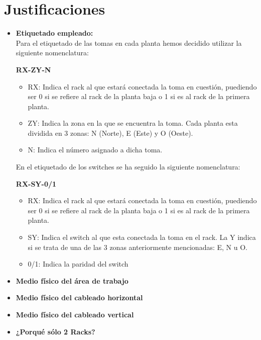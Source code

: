 \section{Justificaciones}
\begin{itemize}
    \item \textbf{Etiquetado empleado: }\\ Para el etiquetado de las tomas en cada planta hemos decidido utilizar la siguiente nomenclatura: \centerline{\textbf{RX-ZY-N}}
    \begin{itemize}
        \item RX: Indica el rack al que estará conectada la toma en cuestión, puediendo ser 0 si se refiere al rack de la planta baja o 1 si es al rack de la primera planta.
        \item ZY: Indica la zona en la que se encuentra la toma. Cada planta esta dividida en 3 zonas: N (Norte), E (Este) y O (Oeste).
        \item N: Indica el número asignado a dicha toma.
    \end{itemize}
    \vspace{0.5cm}
    En el etiquetado de los switches se ha seguido la siguiente nomenclatura: \centerline{\textbf{RX-SY-0/1}}
    \begin{itemize}
        \item RX: Indica el rack al que estará conectada la toma en cuestión, puediendo ser 0 si se refiere al rack de la planta baja o 1 si es al rack de la primera planta.
        \item SY: Indica el switch al que esta conectada la toma en el rack. La Y indica si se trata de una de las 3 zonas anteriormente mencionadas: E, N u O.
        \item 0/1: Indica la paridad del switch
    \end{itemize}
    \vspace{1cm}
    \item \textbf{Medio físico del área de trabajo}
    \vspace{1cm}
    \item \textbf{Medio físico del cableado horizontal}
    \vspace{1cm}
    \item \textbf{Medio físico del cableado vertical}
    \vspace{1cm}
    \item \textbf{¿Porqué sólo 2 Racks?}
\end{itemize}